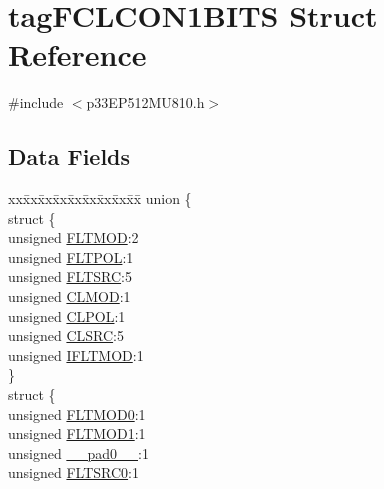 \hypertarget{structtag_f_c_l_c_o_n1_b_i_t_s}{}\section{tag\+F\+C\+L\+C\+O\+N1\+B\+I\+TS Struct Reference}
\label{structtag_f_c_l_c_o_n1_b_i_t_s}


{\ttfamily \#include $<$p33\+E\+P512\+M\+U810.\+h$>$}

\subsection*{Data Fields}
\begin{DoxyCompactItemize}
\item 
\begin{tabbing}
xx\=xx\=xx\=xx\=xx\=xx\=xx\=xx\=xx\=\kill
union \{\\
\>struct \{\\
\>\>unsigned \hyperlink{structtag_f_c_l_c_o_n1_b_i_t_s_af8b7a5d667b31f1b0185c35ff963fc67}{FLTMOD}:2\\
\>\>unsigned \hyperlink{structtag_f_c_l_c_o_n1_b_i_t_s_acc9b95c2c3d735179abf0bb2304d00aa}{FLTPOL}:1\\
\>\>unsigned \hyperlink{structtag_f_c_l_c_o_n1_b_i_t_s_a5a279b9076b9774eeddf447ae606182a}{FLTSRC}:5\\
\>\>unsigned \hyperlink{structtag_f_c_l_c_o_n1_b_i_t_s_a9e490f0d4e5c9492ed27b0835fd4baa1}{CLMOD}:1\\
\>\>unsigned \hyperlink{structtag_f_c_l_c_o_n1_b_i_t_s_aa4163df728ce542fa3662a31fed0dab0}{CLPOL}:1\\
\>\>unsigned \hyperlink{structtag_f_c_l_c_o_n1_b_i_t_s_a55ab508cbc7a5023f1962f743a92a56b}{CLSRC}:5\\
\>\>unsigned \hyperlink{structtag_f_c_l_c_o_n1_b_i_t_s_a4573eed251d96a98a6b5ba1c7cc30451}{IFLTMOD}:1\\
\>\} \\
\>struct \{\\
\>\>unsigned \hyperlink{structtag_f_c_l_c_o_n1_b_i_t_s_acd6a08a1920b6cc12c170cbd6a61247d}{FLTMOD0}:1\\
\>\>unsigned \hyperlink{structtag_f_c_l_c_o_n1_b_i_t_s_accd970bed6a20d6ed7d5a8bb0a9329a3}{FLTMOD1}:1\\
\>\>unsigned \hyperlink{structtag_f_c_l_c_o_n1_b_i_t_s_adf71f3d8410c1f1dbbc96680a92c49af}{\_\_pad0\_\_}:1\\
\>\>unsigned \hyperlink{structtag_f_c_l_c_o_n1_b_i_t_s_ab130e70dc1cfc857cc586e187458c5ea}{FLTSRC0}:1\\

\end{tabbing}
\end{DoxyCompactItemize}
